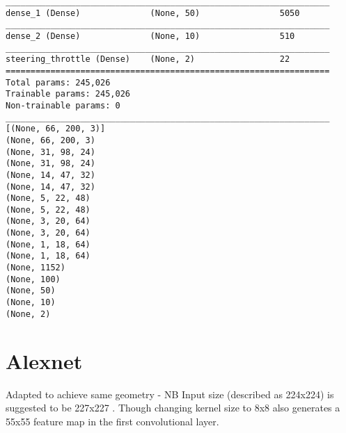 \begin{verbatim}
_________________________________________________________________
dense_1 (Dense)              (None, 50)                5050      
_________________________________________________________________
dense_2 (Dense)              (None, 10)                510       
_________________________________________________________________
steering_throttle (Dense)    (None, 2)                 22        
=================================================================
Total params: 245,026    
Trainable params: 245,026
Non-trainable params: 0
_________________________________________________________________
[(None, 66, 200, 3)]
(None, 66, 200, 3)
(None, 31, 98, 24)
(None, 31, 98, 24)
(None, 14, 47, 32)
(None, 14, 47, 32)
(None, 5, 22, 48)
(None, 5, 22, 48)
(None, 3, 20, 64)
(None, 3, 20, 64)
(None, 1, 18, 64)
(None, 1, 18, 64)
(None, 1152)
(None, 100)
(None, 50)
(None, 10)
(None, 2)

\end{verbatim}


\section{Alexnet}
Adapted to achieve same geometry - NB Input size (described as 224x224) is suggested to  be 227x227 \cite{CS231n}. 
Though changing kernel size to 8x8 also generates a 55x55 feature map in the first convolutional layer.

